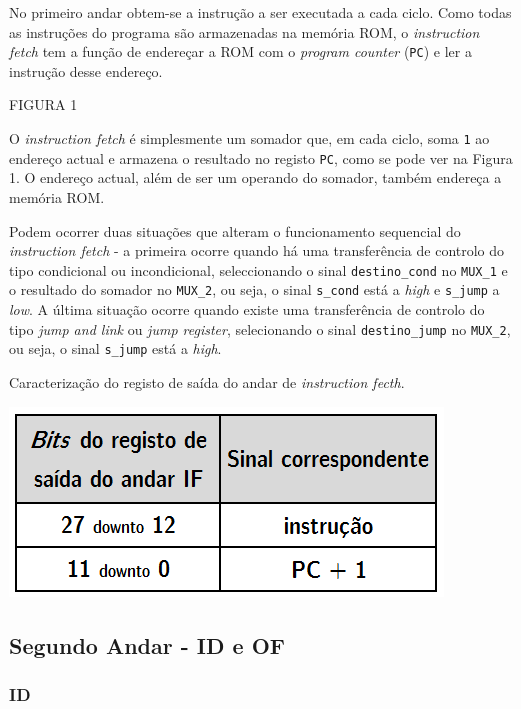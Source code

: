 \documentclass[11pt]{article}
\numberwithin{equation}{section}
\begin{document}
No primeiro andar obtem-se a instrução a ser executada a cada ciclo. Como todas as instruções do programa são armazenadas na memória ROM, o \textit{instruction fetch} tem a função de endereçar a ROM com o \textit{program counter} (\texttt{PC}) e ler a instrução desse endereço.

FIGURA 1

O \textit{instruction fetch} é simplesmente um somador que, em cada ciclo, soma \texttt{1} ao endereço actual e armazena o resultado no registo \texttt{PC}, como se pode ver na Figura 1. O endereço actual, além de ser um operando do somador, também endereça a memória ROM.

Podem ocorrer duas situações que alteram o funcionamento sequencial do \textit{instruction fetch} - a primeira ocorre quando há uma transferência de controlo do tipo condicional ou incondicional, seleccionando o sinal \texttt{destino\_cond} no \texttt{MUX\_1} e o resultado do somador no \texttt{MUX\_2}, ou seja, o sinal \texttt{s\_cond} está a \textit{high} e \texttt{s\_jump} a \textit{low}. A última situação ocorre quando existe uma transferência de controlo do tipo \textit{jump and link} ou \textit{jump register}, selecionando o sinal \texttt{destino\_jump} no \texttt{MUX\_2}, ou seja, o sinal \texttt{s\_jump} está a \textit{high}.


\begin{table}[h]
	\centering
	\caption{Caracterização do registo de saída do andar de \textit{instruction fecth}.}
	\vspace{-2mm}
 	\includegraphics[keepaspectratio=true, scale=0.35]{tabelas/regIF}
\end{table}

\subsection{Segundo Andar - ID e OF}

\subsubsection{ID}
\end{document}
